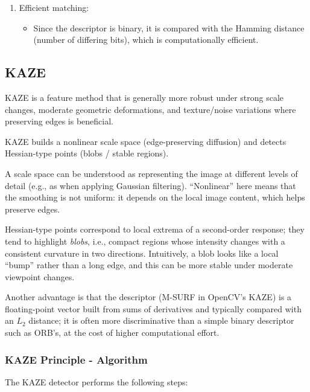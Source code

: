 \begin{enumerate}
    \item Efficient matching:
    \begin{itemize}
        \item Since the descriptor is binary, it is compared with the Hamming distance (number of differing bits), which is computationally efficient.
    \end{itemize}
\end{enumerate}

\subsection{KAZE}

KAZE is a feature method that is generally more robust under strong scale changes, moderate geometric 
deformations, and texture/noise variations where preserving edges is beneficial.

KAZE builds a nonlinear scale space (edge-preserving diffusion) and detects Hessian-type points 
(blobs / stable regions).

A scale space can be understood as representing the image at different levels of detail (e.g., as
 when applying Gaussian filtering). ``Nonlinear'' here means that the smoothing is not uniform: it depends on the 
 local image content, which helps preserve edges.

Hessian-type points correspond to local extrema of a second-order response; they tend to highlight 
\emph{blobs}, i.e., compact regions whose intensity changes with a consistent curvature in two directions. 
Intuitively, a blob looks like a local ``bump'' rather than a long edge, and this can be more stable under
 moderate viewpoint changes.

Another advantage is that the descriptor (M-SURF in OpenCV's KAZE) is a floating-point vector built 
from sums of derivatives and typically compared with an $L_2$ distance; it is often more discriminative 
than a simple binary descriptor such as ORB's, at the cost of higher computational effort.

\subsubsection{KAZE Principle - Algorithm}

The KAZE detector performs the following steps:

